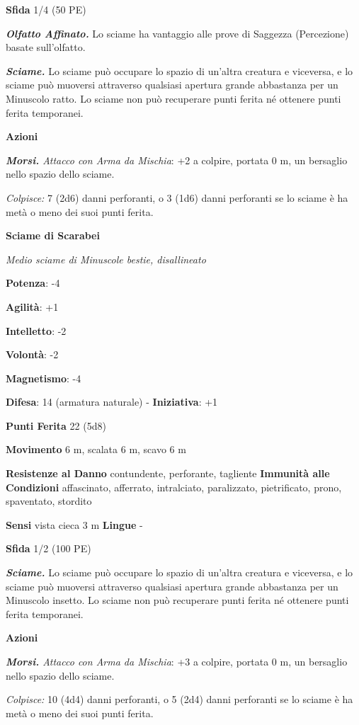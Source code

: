 \begin{multicols}{2}
\textbf{Sfida} 1/4 (50 PE)

\emph{\textbf{Olfatto Affinato.}} Lo sciame ha vantaggio alle prove di
Saggezza (Percezione) basate sull'olfatto.

\emph{\textbf{Sciame.}} Lo sciame può occupare lo spazio di un'altra
creatura e viceversa, e lo sciame può muoversi attraverso qualsiasi
apertura grande abbastanza per un Minuscolo ratto. Lo sciame non può
recuperare punti ferita né ottenere punti ferita temporanei.

\textbf{Azioni}

\emph{\textbf{Morsi.} Attacco con Arma da Mischia}: +2 a colpire,
portata 0 m, un bersaglio nello spazio dello sciame.

\emph{Colpisce:} 7 (2d6) danni perforanti, o 3 (1d6) danni perforanti se
lo sciame è ha metà o meno dei suoi punti ferita.

\textbf{Sciame di Scarabei}

\emph{Medio sciame di Minuscole bestie, disallineato}

\textbf{Potenza}: -4

\textbf{Agilità}: +1

\textbf{Intelletto}: -2

\textbf{Volontà}: -2

\textbf{Magnetismo}: -4

\textbf{Difesa}: 14 (armatura naturale) - \textbf{Iniziativa}: +1

\textbf{Punti Ferita} 22 (5d8)

\textbf{Movimento} 6 m, scalata 6 m, scavo 6 m

\textbf{Resistenze al Danno} contundente, perforante, tagliente
\textbf{Immunità alle Condizioni} affascinato, afferrato, intralciato,
paralizzato, pietrificato, prono, spaventato, stordito

\textbf{Sensi} vista cieca 3 m \textbf{Lingue} -

\textbf{Sfida} 1/2 (100 PE)

\emph{\textbf{Sciame.}} Lo sciame può occupare lo spazio di un'altra
creatura e viceversa, e lo sciame può muoversi attraverso qualsiasi
apertura grande abbastanza per un Minuscolo insetto. Lo sciame non può
recuperare punti ferita né ottenere punti ferita temporanei.

\textbf{Azioni}

\emph{\textbf{Morsi.} Attacco con Arma da Mischia}: +3 a colpire,
portata 0 m, un bersaglio nello spazio dello sciame.

\emph{Colpisce:} 10 (4d4) danni perforanti, o 5 (2d4) danni perforanti
se lo sciame è ha metà o meno dei suoi punti ferita.




\end{multicols}
